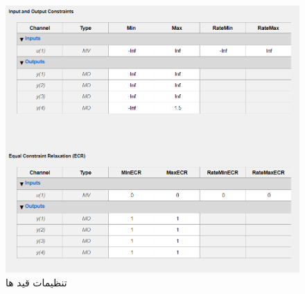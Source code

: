 \begin{figure}[H]
	\centering
	\includegraphics[width=0.7\linewidth]{../img/Q2_LMPC_ِsoft_setting1}
	\caption{تنظیمات قید ها}
	\label{fig:q2lmpcsoftsetting1}
\end{figure}
